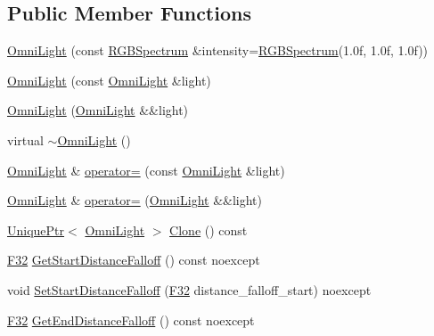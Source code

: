 \subsection*{Public Member Functions}
\begin{DoxyCompactItemize}
\item 
\hyperlink{classmage_1_1_omni_light_a94794dd7c19fcac0c0d0b9d83108513b}{Omni\+Light} (const \hyperlink{structmage_1_1_r_g_b_spectrum}{R\+G\+B\+Spectrum} \&intensity=\hyperlink{structmage_1_1_r_g_b_spectrum}{R\+G\+B\+Spectrum}(1.\+0f, 1.\+0f, 1.\+0f))
\item 
\hyperlink{classmage_1_1_omni_light_accf10bcdf8ed523cfb04129f5345ef92}{Omni\+Light} (const \hyperlink{classmage_1_1_omni_light}{Omni\+Light} \&light)
\item 
\hyperlink{classmage_1_1_omni_light_ae0353cedc67d88be2f4b88374482933d}{Omni\+Light} (\hyperlink{classmage_1_1_omni_light}{Omni\+Light} \&\&light)
\item 
virtual \hyperlink{classmage_1_1_omni_light_af6f4921499b430041966f38aac920b69}{$\sim$\+Omni\+Light} ()
\item 
\hyperlink{classmage_1_1_omni_light}{Omni\+Light} \& \hyperlink{classmage_1_1_omni_light_a7bdce151d327daef5e1f31daedcc4627}{operator=} (const \hyperlink{classmage_1_1_omni_light}{Omni\+Light} \&light)
\item 
\hyperlink{classmage_1_1_omni_light}{Omni\+Light} \& \hyperlink{classmage_1_1_omni_light_a287a54dede61e65efe4493ec20531428}{operator=} (\hyperlink{classmage_1_1_omni_light}{Omni\+Light} \&\&light)
\item 
\hyperlink{namespacemage_a3316d7143a973e37adf1110f2e80ca31}{Unique\+Ptr}$<$ \hyperlink{classmage_1_1_omni_light}{Omni\+Light} $>$ \hyperlink{classmage_1_1_omni_light_a82325924de65733314dcf2b87e926d60}{Clone} () const
\item 
\hyperlink{namespacemage_aa97e833b45f06d60a0a9c4fc22ae02c0}{F32} \hyperlink{classmage_1_1_omni_light_a32551ce9c37a3f4f6fa2ba9faba47358}{Get\+Start\+Distance\+Falloff} () const noexcept
\item 
void \hyperlink{classmage_1_1_omni_light_a221f403ca37b500dff1085d2e74f582c}{Set\+Start\+Distance\+Falloff} (\hyperlink{namespacemage_aa97e833b45f06d60a0a9c4fc22ae02c0}{F32} distance\+\_\+falloff\+\_\+start) noexcept
\item 
\hyperlink{namespacemage_aa97e833b45f06d60a0a9c4fc22ae02c0}{F32} \hyperlink{classmage_1_1_omni_light_abe17539c94e52b00a1182cd9780dbf77}{Get\+End\+Distance\+Falloff} () const noexcept
\item 

\end{DoxyCompactItemize}
